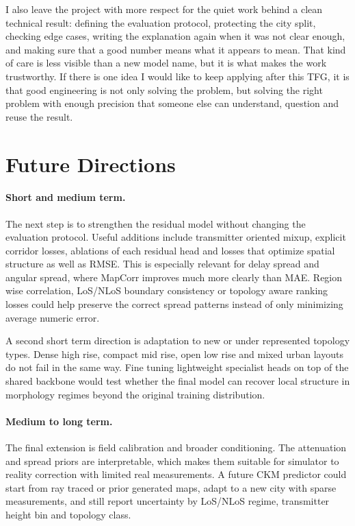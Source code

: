 I also leave the project with more respect for the quiet work behind a clean
technical result: defining the evaluation protocol, protecting the city split,
checking edge cases, writing the explanation again when it was not clear
enough, and making sure that a good number means what it appears to mean. That
kind of care is less visible than a new model name, but it is what makes the
work trustworthy. If there is one idea I would like to keep applying after this
TFG, it is that good engineering is not only solving the problem, but solving
the right problem with enough precision that someone else can understand,
question and reuse the result.

\section{Future Directions}

\paragraph{Short and medium term.}
The next step is to strengthen the residual model without changing the
evaluation protocol. Useful additions include transmitter oriented mixup,
explicit corridor losses, ablations of each residual head and losses that
optimize spatial structure as well as RMSE. This is especially relevant for
delay spread and angular spread, where MapCorr improves much more clearly than
MAE. Region wise correlation, LoS/NLoS boundary consistency or topology aware
ranking losses could help preserve the correct spread patterns instead of only
minimizing average numeric error.

A second short term direction is adaptation to new or under represented
topology types. Dense high rise, compact mid rise, open low rise and mixed
urban layouts do not fail in the same way. Fine tuning lightweight specialist
heads on top of the shared backbone would test whether the final model can
recover local structure in morphology regimes beyond the original training
distribution.

\paragraph{Medium to long term.}
The final extension is field calibration and broader conditioning. The
attenuation and spread priors are interpretable, which makes them suitable for
simulator to reality correction with limited real measurements. A future CKM
predictor could start from ray traced or prior generated maps, adapt to a new
city with sparse measurements, and still report uncertainty by LoS/NLoS regime,
transmitter height bin and topology class.

